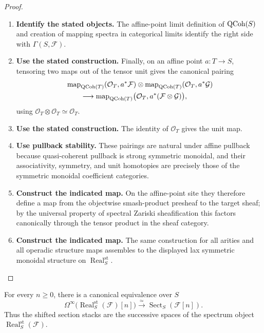\begin{proof}
\begin{enumerate}[label=\textup{(\arabic*)}]
\[\begin{aligned}
    &\simeq
    \operatorname*{lim}_{(T,a)\in\operatorname{AffPt}(S)^{\op}}
    \Gamma(T,a^*\mathcal F).
    \end{aligned}
    \]
    \item \textbf{Identify the stated objects.}
    The affine-point limit definition of \(\operatorname{QCoh}(S)\) and creation of mapping
    spectra in categorical limits identify the right side with
    \(\Gamma(S,\mathcal F)\).
    \item \textbf{Use the stated construction.}
    Finally, on an affine point \(a:T\to S\), tensoring two maps out of the tensor unit
    gives the canonical pairing
    \[
    \begin{aligned}
    &\operatorname{map}_{\operatorname{QCoh}(T)}(\mathcal O_T,a^*\mathcal F)
    \otimes
    \operatorname{map}_{\operatorname{QCoh}(T)}(\mathcal O_T,a^*\mathcal G)
    \\
    &\qquad\longrightarrow
    \operatorname{map}_{\operatorname{QCoh}(T)}
    \bigl(\mathcal O_T,a^*(\mathcal F\otimes\mathcal G)\bigr),
    \end{aligned}
    \]
    using \(\mathcal O_T\otimes\mathcal O_T\simeq\mathcal O_T\).
    \item \textbf{Use the stated construction.}
    The identity of
    \(\mathcal O_T\) gives the unit map.
    \item \textbf{Use pullback stability.}
    These pairings are natural under affine
    pullback because quasi-coherent pullback is strong symmetric monoidal, and their
    associativity, symmetry, and unit homotopies are precisely those of the symmetric
    monoidal coefficient categories.
    \item \textbf{Construct the indicated map.}
    On the affine-point site they therefore define a
    map from the objectwise smash-product presheaf to the target sheaf; by the universal
    property of spectral Zariski sheafification this factors canonically through the
    tensor product in the sheaf category.
    \item \textbf{Construct the indicated map.}
    The same construction for all arities and all
    operadic structure maps assembles to the displayed lax symmetric monoidal structure
    on \(\operatorname{Real}^{\mathrm{st}}_S\).
\end{enumerate}
\end{proof}

\begin{corollary}
\label{cor:stable-realization-section-stack}
For every \(n\geq0\), there is a canonical equivalence over \(S\)
\[
  \Omega^\infty
  \bigl(\operatorname{Real}^{\mathrm{st}}_S(\mathcal F)[n]\bigr)
  \xrightarrow{\simeq}
  \operatorname{Sect}_S(\mathcal F[n]).
\]
Thus the shifted section stacks are the successive spaces of the spectrum object
\(\operatorname{Real}^{\mathrm{st}}_S(\mathcal F)\).
\end{corollary}

